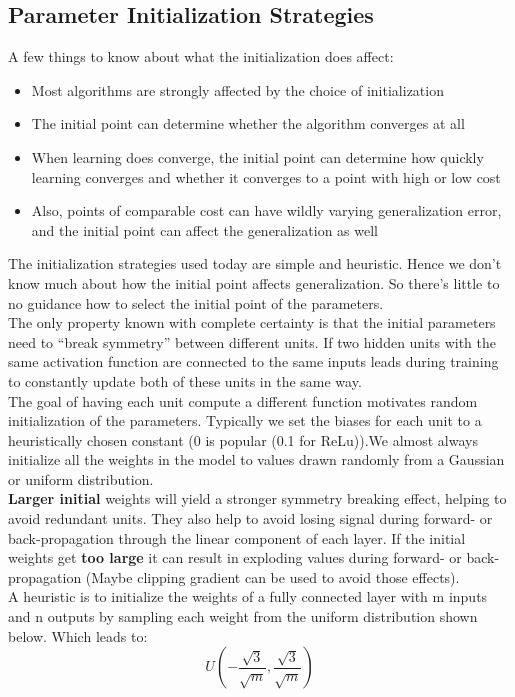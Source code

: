 \begin{multicols}{2}
	\subsection{Parameter Initialization Strategies }
	A few things to know about what the initialization does affect:
	\begin{itemize}
		\item Most algorithms are strongly affected by the choice of initialization
		\item The initial point can determine whether the algorithm converges at all
		\item When learning does converge, the initial point can determine how quickly learning converges and whether it converges to a point with high or low cost
		\item Also, points of comparable cost can have wildly varying generalization error, and the initial point can affect the generalization as well
	\end{itemize}

	The initialization strategies used today are simple and heuristic. Hence we don't know much about
	how the initial point affects generalization. So there's little to no guidance how to select the initial point of the parameters.\\
	The only property known with complete certainty is that the initial parameters need to “break symmetry” between different units. If two hidden units with the same activation function are connected to the same inputs leads during training to constantly update both of these units in the same way.\\
	The goal of having each unit compute a different function motivates	random initialization of the parameters. Typically we set the biases for each unit to a heuristically chosen constant (0 is popular (0.1 for ReLu)).We almost always initialize all the weights in the model to values drawn randomly from a Gaussian or uniform distribution.\\
	\textbf{Larger initial }weights will yield a stronger symmetry breaking effect, helping to avoid redundant units. They also help to avoid losing signal during forward- or back-propagation through the linear component of each layer. If the initial weights get \textbf{too large} it can result in exploding values during forward- or back-propagation (Maybe clipping gradient can be used to avoid those effects).\\

	A heuristic is to initialize the weights of a fully connected layer with m inputs and n outputs by sampling each weight from the uniform distribution shown below. Which leads to:
	\[  U(-\frac{\sqrt{3}}{\sqrt{m}}, \frac{\sqrt{3}}{\sqrt{m}}) \]


\end{multicols}

